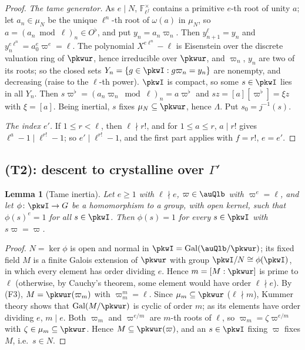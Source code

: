 \documentclass[10pt]{amsart}
\newtheorem{lemma}[theorem]{Lemma}
\theoremstyle{definition}
\theoremstyle{remark}
\begin{document}
\begin{proof}
\emph{The tame generator.} As $e\mid N$, $\mathbb F_{\ell^f}^\times$ contains a primitive $e$-th root of
unity $a$; let $a_n\in\mu_N$ be the unique $\ell^n$-th root of $\omega(a)$ in $\mu_N$, so
$a=(a_n\bmod\ell)_n\in O^\flat$, and put $y_n=a_n\varpi_n$. Then $y_{n+1}^\ell=y_n$ and
$y_n^{e\ell^n}=a_0^e\varpi^e=\ell$. The polynomial $X^{e\ell^n}-\ell$ is Eisenstein over the discrete
valuation ring of $\pkwur$, hence irreducible over $\pkwur$, and $\varpi_n$, $y_n$ are two of its roots;
so the closed sets $Y_n=\{g\in\pkwI:g\varpi_n=y_n\}$ are nonempty, and decreasing (raise to the $\ell$-th
power). $\pkwI$ is compact, so some $s\in\pkwI$ lies in all $Y_n$. Then $s\varpi^\flat=(a_n\varpi_n\bmod\ell)_n
=a\varpi^\flat$ and $sz=[a][\varpi^\flat]=\xi z$ with $\xi=[a]$. Being inertial, $s$ fixes $\mu_N\subseteq
\pkwur$, hence $\Lambda$. Put $s_0=j^{-1}(s)$.

\emph{The index $e'$.} If $1\le r<\ell$, then $\ell\nmid r!$, and for $1\le a\le r$, $a\mid r!$ gives
$\ell^a-1\mid\ell^{r!}-1$; so $e'\mid\ell^{r!}-1$, and the first part applies with $f=r!$, $e=e'$.
\end{proof}

\subsection{(T2): descent to crystalline over $\Gamma'$}\label{pkw:ss-T2}

\begin{lemma}[Tame inertia]\label{pkw:tame-inertia}
Let $e\ge1$ with $\ell\nmid e$, $\varpi\in\auQlb$ with $\varpi^e=\ell$, and let $\phi\colon\pkwI\to G$ be a
homomorphism to a group, with open kernel, such that $\phi(s)^e=1$ for all $s\in\pkwI$. Then $\phi(s)=1$ for
every $s\in\pkwI$ with $s\varpi=\varpi$.
\end{lemma}

\begin{proof}
$N=\ker\phi$ is open and normal in $\pkwI=\operatorname{Gal}(\auQlb/\pkwur)$; its fixed field $M$ is a finite
Galois extension of $\pkwur$ with group $\pkwI/N\cong\phi(\pkwI)$, in which every element has order dividing
$e$. Hence $m=[M:\pkwur]$ is prime to $\ell$ (otherwise, by Cauchy's theorem, some element would have order
$\ell\nmid e$). By (F3), $M=\pkwur(\varpi_m)$ with $\varpi_m^m=\ell$. Since $\mu_m\subseteq\pkwur$ ($\ell\nmid m$),
Kummer theory shows that $\operatorname{Gal}(M/\pkwur)$ is cyclic of order $m$; as its elements have order
dividing $e$, $m\mid e$. Both $\varpi_m$ and $\varpi^{e/m}$ are $m$-th roots of $\ell$, so
$\varpi_m=\zeta\varpi^{e/m}$ with $\zeta\in\mu_m\subseteq\pkwur$. Hence $M\subseteq\pkwur(\varpi)$, and an
$s\in\pkwI$ fixing $\varpi$ fixes $M$, i.e.\ $s\in N$.
\end{proof}
\end{document}
